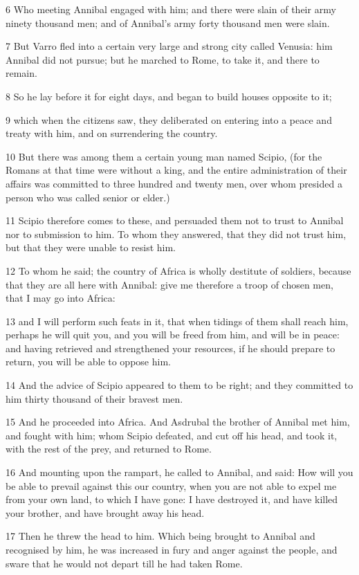 6 Who meeting Annibal engaged with him; and there were slain of their army ninety thousand men; and of Annibal’s army forty thousand men were slain. 

7 But Varro fled into a certain very large and strong city called Venusia: him Annibal did not pursue; but he marched to Rome, to take it, and there to remain. 

8 So he lay before it for eight days, and began to build houses opposite to it; 

9 which when the citizens saw, they deliberated on entering into a peace and treaty with him, and on surrendering the country. 

10 But there was among them a certain young man named Scipio, (for the Romans at that time were without a king, and the entire administration of their affairs was committed to three hundred and twenty men, over whom presided a person who was called senior or elder.) 

11 Scipio therefore comes to these, and persuaded them not to trust to Annibal nor to submission to him. To whom they answered, that they did not trust him, but that they were unable to resist him. 

12 To whom he said; the country of Africa is wholly destitute of soldiers, because that they are all here with Annibal: give me therefore a troop of chosen men, that I may go into Africa: 

13 and I will perform such feats in it, that when tidings of them shall reach him, perhaps he will quit you, and you will be freed from him, and will be in peace: and having retrieved and strengthened your resources, if he should prepare to return, you will be able to oppose him. 

14 And the advice of Scipio appeared to them to be right; and they committed to him thirty thousand of their bravest men. 

15 And he proceeded into Africa. And Asdrubal the brother of Annibal met him, and fought with him; whom Scipio defeated, and cut off his head, and took it, with the rest of the prey, and returned to Rome. 

16 And mounting upon the rampart, he called to Annibal, and said: How will you be able to prevail against this our country, when you are not able to expel me from your own land, to which I have gone: I have destroyed it, and have killed your brother, and have brought away his head. 

17 Then he threw the head to him. Which being brought to Annibal and recognised by him, he was increased in fury and anger against the people, and sware that he would not depart till he had taken Rome. 

